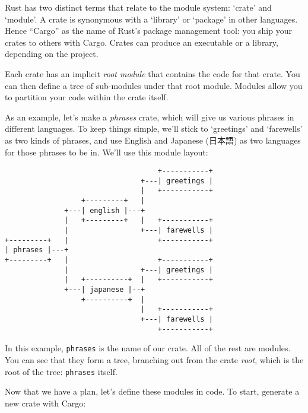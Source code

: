 \documentclass[a4paper,]{book}
\newenvironment{Shaded}{\begin{snugshade}}{\end{snugshade}}
\newcommand{\KeywordTok}[1]{\textcolor[rgb]{0.13,0.29,0.53}{\textbf{{#1}}}}
\newcommand{\NormalTok}[1]{{#1}}
\begin{document}
Rust has two distinct terms that relate to the module system: `crate'
and `module'. A crate is synonymous with a `library' or `package' in
other languages. Hence ``Cargo'' as the name of Rust's package
management tool: you ship your crates to others with Cargo. Crates can
produce an executable or a library, depending on the project.

Each crate has an implicit \emph{root module} that contains the code for
that crate. You can then define a tree of sub-modules under that root
module. Modules allow you to partition your code within the crate
itself.

As an example, let's make a \emph{phrases} crate, which will give us
various phrases in different languages. To keep things simple, we'll
stick to `greetings' and `farewells' as two kinds of phrases, and use
English and Japanese (日本語) as two languages for those phrases to be
in. We'll use this module layout:

\begin{verbatim}
                                    +-----------+
                                +---| greetings |
                                |   +-----------+
                  +---------+   |
              +---| english |---+
              |   +---------+   |   +-----------+
              |                 +---| farewells |
+---------+   |                     +-----------+
| phrases |---+
+---------+   |                     +-----------+
              |                 +---| greetings |
              |   +----------+  |   +-----------+
              +---| japanese |--+
                  +----------+  |
                                |   +-----------+
                                +---| farewells |
                                    +-----------+
\end{verbatim}

In this example, \texttt{phrases} is the name of our crate. All of the
rest are modules. You can see that they form a tree, branching out from
the crate \emph{root}, which is the root of the tree: \texttt{phrases}
itself.

Now that we have a plan, let's define these modules in code. To start,
generate a new crate with Cargo:

\begin{Shaded}
\end{Shaded}
\end{document}
